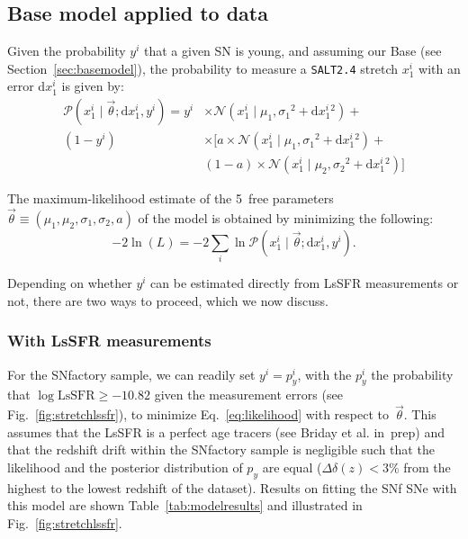 \documentclass[]{aa} %
\newcommand{\mr}[1]{{\textcolor[rgb]{0.60,0.10,0.6}{#1}}}
\newcommand{\prob}[2]{\mathcal{P}\left( #1 \mid #2\right)}
\begin{document}
\subsection{Base model applied to data}\label{sec:basemodelapplied}

Given the probability $y^i$ that a given SN is young, and assuming our Base (see
Section~\ref{sec:basemodel}), the probability to measure a
\textsc{\texttt{SALT2.4}} stretch $x_1^i$ with an error d$x_1^i$ is given by:
\begin{align}\label{eq:likelihoodsnf}
    \prob{x^i_1}{\vec{\theta}; \mathrm{d}x^i_1, y^i} =
    y^i & \times
    \mathcal{N}\left(x^i_1 \mid \mu_1, \sigma_1{}^2+\mathrm{d}x^i_1{}^2\right) +
    \nonumber\\
    (1-y^i) &\times \bigg[
    a \times \mathcal{N}\left(x^i_1 \mid \mu_1,
    \sigma_1{}^2+\mathrm{d}x^i_1{}^2\right) +
    \nonumber\\
    & (1-a) \times \mathcal{N}\left(x^i_1 \mid \mu_2,
    \sigma_2{}^{2}+\mathrm{d}x^i_1{}^2\right) \bigg]
\end{align}

The maximum-likelihood estimate of the 5~free parameters
$\vec{\theta}\equiv({\mu_1,\mu_2,\sigma_1,\sigma_2,a})$ of the model is obtained
by minimizing the following:
\begin{equation}\label{eq:likelihood}
    -2\ln(L) = -2 \sum_i \ln \prob{x_1^i}{\vec{\theta};
    \mathrm{d}x_1^i, y^i}.
\end{equation}

Depending on whether $y^i$ can be estimated directly from LsSFR measurements or
not, there are two ways to proceed, which we now discuss.

\subsubsection{With LsSFR measurements}\label{sec:modelpy}

For the SNfactory sample, we can readily set $y^i = p_y^i$, with the $p_y^i$ the probability that $\log \mathrm{LsSFR} \geq -10.82$ given the measurement errors (see Fig.~\ref{fig:stretchlssfr}), to
minimize Eq.~\ref{eq:likelihood} with respect to~$\vec{\theta}$. \mr{This assumes that the LsSFR is a perfect age tracers (see Briday et al. in~prep) and that the redshift drift within the SNfactory sample is negligible such that the likelihood and the posterior distribution of $p_y$ are equal  ($\Delta\delta(z)<3\%$ from the highest to the lowest redshift of the dataset).}
Results on
fitting the SNf SNe with this model are shown Table~\ref{tab:modelresults} and
illustrated in Fig.~\ref{fig:stretchlssfr}.
\end{document}
